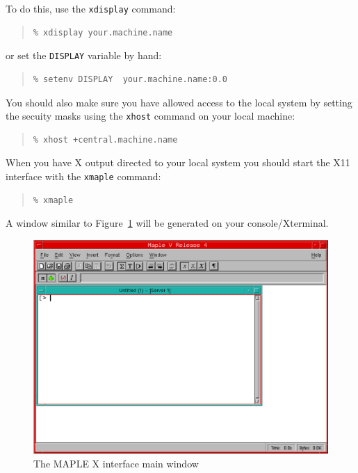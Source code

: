 \documentclass[twoside,11pt]{article}
\newenvironment{latexonly}{}{}
\begin{document}
To do this, use the \texttt{xdisplay} command:

\begin{quote}\begin{verbatim}
% xdisplay your.machine.name
\end{verbatim}\end{quote}

or set the \texttt{DISPLAY} variable by hand:

\begin{quote}\begin{verbatim}
% setenv DISPLAY  your.machine.name:0.0
\end{verbatim}\end{quote}

You should also make sure you have allowed access to the local system by 
setting the secuity masks using the \texttt{xhost} command on your local 
machine:

\begin{quote}\begin{verbatim}
% xhost +central.machine.name
\end{verbatim}\end{quote}

When you have X output directed to your local system you should start the
X11 interface with the \texttt{xmaple} command:

\begin{quote}\begin{verbatim}
% xmaple
\end{verbatim}\end{quote}

A window similar to Figure~\ref{fig_main_window} will be generated on your
console/Xterminal.

\begin{latexonly}
\begin{figure}[h]
\begin{center}
\includegraphics[scale=0.55]{sun107_f1.eps}
\caption{The MAPLE X interface main window}
\label{fig_main_window}
\end{center}
\end{figure}
\end{latexonly}
\end{document}

